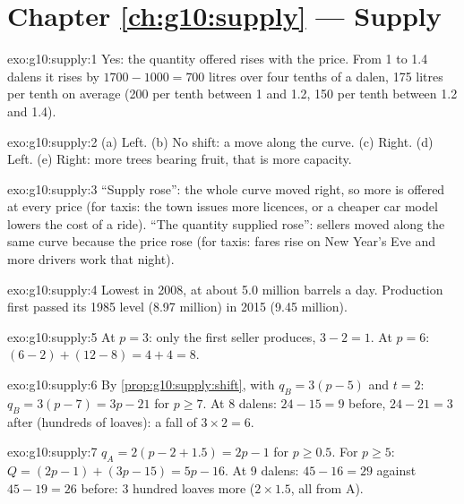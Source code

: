 \section*{Chapter \ref{ch:g10:supply} --- Supply}

\begin{solution}{exo:g10:supply:1}
Yes: the quantity offered rises with the price. From 1 to 1.4 dalens it rises by $1700 - 1000 = 700$ litres over four tenths of a dalen,
175 litres per tenth on average (200 per tenth between 1 and 1.2, 150 per tenth between 1.2 and 1.4).
\end{solution}

\begin{solution}{exo:g10:supply:2}
(a) Left. (b) No shift: a move along the curve. (c) Right. (d) Left. (e) Right: more trees bearing fruit, that is more capacity.
\end{solution}

\begin{solution}{exo:g10:supply:3}
``Supply rose'': the whole curve moved right, so more is offered at every price (for taxis: the town issues more licences, or a cheaper car
model lowers the cost of a ride). ``The quantity supplied rose'': sellers moved along the same curve because the price rose (for taxis: fares
rise on New Year's Eve and more drivers work that night).
\end{solution}

\begin{solution}{exo:g10:supply:4}
Lowest in 2008, at about 5.0 million barrels a day. Production first passed its 1985 level (8.97 million) in 2015 (9.45 million).
\end{solution}

\begin{solution}{exo:g10:supply:5}
At $p = 3$: only the first seller produces, $3 - 2 = 1$. At $p = 6$: $(6 - 2) + (12 - 8) = 4 + 4 = 8$.
\end{solution}

\begin{solution}{exo:g10:supply:6}
By \cref{prop:g10:supply:shift}, with $q_B = 3(p - 5)$ and $t = 2$: $q_B = 3(p - 7) = 3p - 21$ for $p \ge 7$. At 8 dalens: $24 - 15 = 9$ before,
$24 - 21 = 3$ after (hundreds of loaves): a fall of $3 \times 2 = 6$.
\end{solution}

\begin{solution}{exo:g10:supply:7}
$q_A = 2(p - 2 + 1.5) = 2p - 1$ for $p \ge 0.5$. For $p \ge 5$: $Q = (2p - 1) + (3p - 15) = 5p - 16$. At 9 dalens: $45 - 16 = 29$ against $45 - 19 = 26$
before: 3 hundred loaves more ($2 \times 1.5$, all from A).
\end{solution}

